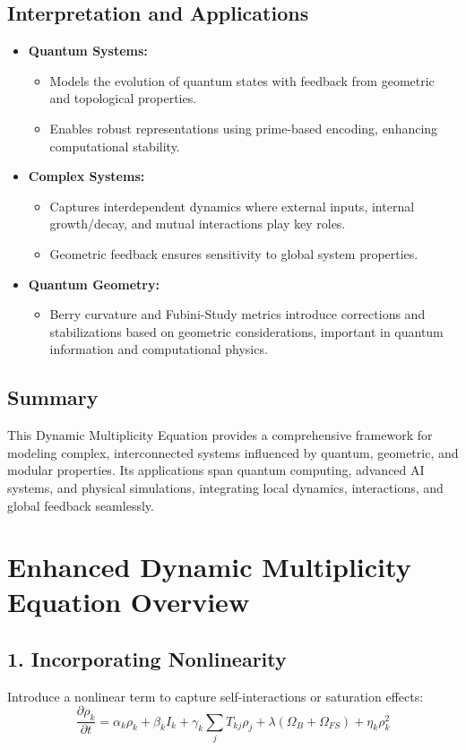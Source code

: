 \documentclass{article}
\theoremstyle{plain}
\begin{document}
\subsection{Interpretation and Applications}
\begin{itemize}
    \item \textbf{Quantum Systems:}
    \begin{itemize}
        \item Models the evolution of quantum states with feedback from geometric and topological properties.
        \item Enables robust representations using prime-based encoding, enhancing computational stability.
    \end{itemize}
    \item \textbf{Complex Systems:}
    \begin{itemize}
        \item Captures interdependent dynamics where external inputs, internal growth/decay, and mutual interactions play key roles.
        \item Geometric feedback ensures sensitivity to global system properties.
    \end{itemize}
    \item \textbf{Quantum Geometry:}
    \begin{itemize}
        \item Berry curvature and Fubini-Study metrics introduce corrections and stabilizations based on geometric considerations, important in quantum information and computational physics.
    \end{itemize}
\end{itemize}

\subsection{Summary}
This Dynamic Multiplicity Equation provides a comprehensive framework for modeling complex, interconnected systems influenced by quantum, geometric, and modular properties. Its applications span quantum computing, advanced AI systems, and physical simulations, integrating local dynamics, interactions, and global feedback seamlessly.

\section{Enhanced Dynamic Multiplicity Equation Overview}

\subsection*{1. Incorporating Nonlinearity}
Introduce a nonlinear term to capture self-interactions or saturation effects:
\begin{equation}
\frac{\partial \rho_k}{\partial t} = \alpha_k \rho_k + \beta_k I_k + \gamma_k \sum_j T_{kj} \rho_j + \lambda (\Omega_B + \Omega_{FS}) + \eta_k \rho_k^2
\end{equation}
\end{document}
